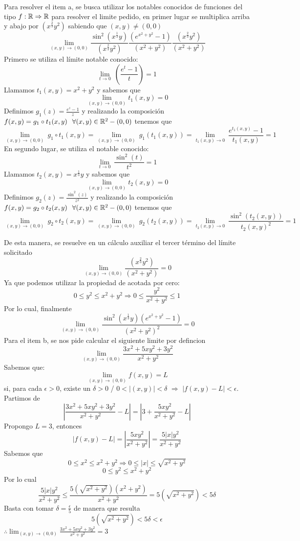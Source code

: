 \begin{solution}
    Para resolver el item a, se busca utilizar los notables conocidos de funciones del tipo $f:\mathbb{R}\Rightarrow\mathbb{R}$ para resolver el limite pedido, en primer lugar se multiplica arriba y abajo por $(x^{\frac{2}{3}}y^2)$ sabiendo que $(x,y)\neq(0,0)$
    \[
        \lim_{(x,y)\to(0,0)} \frac{\sin^2{(x^{\frac{1}{3}}y)}}{(x^{\frac{2}{3}}y^2)}\frac{(e^{x^2+y^2}-1)}{(x^2+y^2)}\frac{(x^{\frac{2}{3}}y^2)}{(x^2+y^2)}
    \]
Primero se utiliza el límite notable conocido:    
\[
        \lim_{t\to 0} \
        (\frac{e^{t}-1}{t})=1
    \]
    Llamamos  $t_1(x,y)=x^{2}+y^{2}$ y sabemos que 
   \[
        \lim_{(x,y)\to(0,0)} t_1(x,y)=0
    \]
    Definimos $g_1(z)=\frac{e^{z}-1}{z} $ y realizando la composición $f(x,y)=g_1\circ t_1(x,y) \hspace{0.25cm}\forall (x,y)\in \mathbb{R}^ 2 -(0,0)$ tenemos que
\[
        \lim_{(x,y)\to (0,0)} \
        g_1\circ t_1(x,y)=\lim_{(x,y)\to (0,0)} \
        g_1(t_1(x,y))=\lim_{t_1(x,y)\to 0} \
        \frac{e^{t_1(x,y)}-1}{t_1(x,y)}=1
    \]
En segundo lugar, se utiliza el notable conocido: 
\[
        \lim_{t\to 0} \
        \frac{\sin^2{(t)}}{t^2}=1
 \]
  Llamamos  $t_2(x,y)=x^{\frac{1}{3}}y$ y sabemos que 
   \[
        \lim_{(x,y)\to(0,0)} t_2(x,y)=0
    \]
    Definimos $g_2(z)=\frac{\sin^2{(z)}}{z^2} $ y realizando la composición $f(x,y)=g_2\circ t_2(x,y) \hspace{0.25cm}\forall (x,y)\in \mathbb{R}^ 2 -(0,0)$ tenemos que
\[
        \lim_{(x,y)\to (0,0)} \
        g_2\circ t_2(x,y)=\lim_{(x,y)\to (0,0)} \
        g_2(t_2(x,y))=\lim_{t_2(x,y)\to 0} \
        \frac{\sin^2{(t_2(x,y))}}{t_2(x,y)^2}=1
    \]

    De esta manera, se resuelve en un cálculo auxiliar el tercer término del límite solicitado
\[
        \lim_{(x,y)\to(0,0)} \frac{(x^{\frac{2}{3}}y^2)}{(x^2+y^2)}=0
    \]
Ya que podemos utilizar la propiedad de acotada por cero:
\[
        0\le y^2\le x^2+y^2    \Rightarrow   0\le \frac{y^2}{x^2+y^2}\le 1
    \]
Por lo cual, finalmente
\[
        \lim_{(x,y)\to(0,0)} \frac{\sin^2{(x^{\frac{1}{3}}y)}(e^{x^2+y^2}-1)}{(x^2+y^2)^2}=0
    \]
\newpage
Para el item b, se nos pide calcular el siguiente limite por defincion
\[
        \lim_{(x,y)\to(0,0)} \frac{3x^2+5xy^2+3y^2}{x^2+y^2}
    \]
Sabemos que:
\[
\lim_{(x,y) \to (0,0)} f(x,y) = L
\]
si, para cada \( \epsilon > 0 \), existe un \( \delta > 0 \) / \( 0 < |(x,y)| < \delta \) $\Rightarrow$ \( |f(x,y) - L| < \epsilon \).
Partimos de 
\[
|\frac{3x^2+5xy^2+3y^2}{x^2+y^2}-L|=|3+\frac{5xy^2}{x^2+y^2}-L|
\]
Propongo $L=3$, entonces
\[
|f(x,y) - L|=|\frac{5xy^2}{x^2+y^2}|=\frac{5|x|y^2}{x^2+y^2}
\]
Sabemos que 
\[
0\le x^2\le x^2+y^2 \Rightarrow 0\le |x|\le \sqrt{x^2+y^2 }
\]
\[
0\le y^2\le x^2+y^2
\]
Por lo cual
\[
\frac{5|x|y^2}{x^2+y^2} \le \frac{5(\sqrt{x^2+y^2})(x^2+y^2)}{x^2+y^2}=5(\sqrt{x^2+y^2})<5\delta
\]
Basta con tomar $\delta=\frac{\epsilon}{5}$ de manera que resulta
\[
5(\sqrt{x^2+y^2})<5\delta<\epsilon
\]
$\therefore  \lim_{(x,y)\to(0,0)} \frac{3x^2+5xy^2+3y^2}{x^2+y^2}=3$ 
\end{solution}
\newpage


